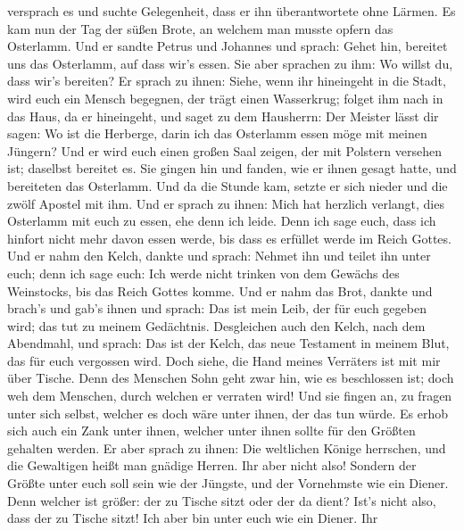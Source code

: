 versprach es und suchte Gelegenheit, dass er ihn überantwortete ohne
Lärmen.  Es kam nun der Tag der süßen Brote, an welchem man
musste opfern das Osterlamm.  Und er sandte Petrus und
Johannes und sprach: Gehet hin, bereitet uns das Osterlamm, auf dass
wir's essen.  Sie aber sprachen zu ihm: Wo willst du, dass
wir's bereiten?  Er sprach zu ihnen: Siehe, wenn ihr
hineingeht in die Stadt, wird euch ein Mensch begegnen, der trägt einen
Wasserkrug; folget ihm nach in das Haus, da er hineingeht, 
und saget zu dem Hausherrn: Der Meister lässt dir sagen: Wo ist die
Herberge, darin ich das Osterlamm essen möge mit meinen Jüngern?
 Und er wird euch einen großen Saal zeigen, der mit
Polstern versehen ist; daselbst bereitet es.  Sie gingen
hin und fanden, wie er ihnen gesagt hatte, und bereiteten das Osterlamm.
 Und da die Stunde kam, setzte er sich nieder und die zwölf
Apostel mit ihm.  Und er sprach zu ihnen: Mich hat herzlich
verlangt, dies Osterlamm mit euch zu essen, ehe denn ich leide.
 Denn ich sage euch, dass ich hinfort nicht mehr davon
essen werde, bis dass es erfüllet werde im Reich Gottes. 
Und er nahm den Kelch, dankte und sprach: Nehmet ihn und teilet ihn
unter euch;  denn ich sage euch: Ich werde nicht trinken
von dem Gewächs des Weinstocks, bis das Reich Gottes komme.
 Und er nahm das Brot, dankte und brach's und gab's ihnen
und sprach: Das ist mein Leib, der für euch gegeben wird; das tut zu
meinem Gedächtnis.  Desgleichen auch den Kelch, nach dem
Abendmahl, und sprach: Das ist der Kelch, das neue Testament in meinem
Blut, das für euch vergossen wird.  Doch siehe, die Hand
meines Verräters ist mit mir über Tische.  Denn des
Menschen Sohn geht zwar hin, wie es beschlossen ist; doch weh dem
Menschen, durch welchen er verraten wird!  Und sie fingen
an, zu fragen unter sich selbst, welcher es doch wäre unter ihnen, der
das tun würde.  Es erhob sich auch ein Zank unter ihnen,
welcher unter ihnen sollte für den Größten gehalten werden.
 Er aber sprach zu ihnen: Die weltlichen Könige herrschen,
und die Gewaltigen heißt man gnädige Herren.  Ihr aber
nicht also! Sondern der Größte unter euch soll sein wie der Jüngste, und
der Vornehmste wie ein Diener.  Denn welcher ist größer:
der zu Tische sitzt oder der da dient? Ist's nicht also, dass der zu
Tische sitzt! Ich aber bin unter euch wie ein Diener.  Ihr
